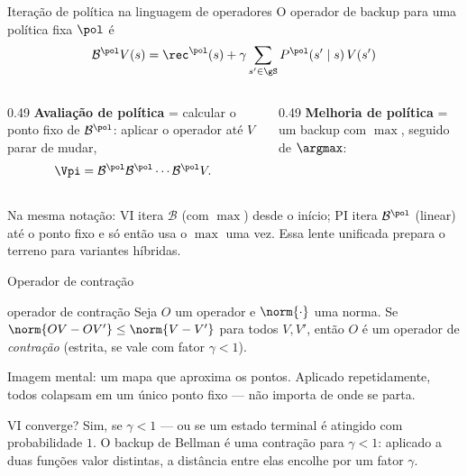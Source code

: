 \documentclass[aspectratio=169, 11pt]{beamer}
\newcommand{\Bop}{\mathcal{B}}                 %
\newcommand{\Bpol}{\mathcal{B}^{\pol}}         %
\begin{document}
\begin{frame}{Iteração de política na linguagem de operadores}
  O operador de backup \alert{para uma política fixa} $\pol$ é
  \[
    \Bpol V(s) = \rec^{\pol}(s) + \gamma \sum_{s' \in \gS} P^{\pol}(s' \mid s)\, V(s')
  \]
  \begin{columns}[T]
    \begin{column}{0.49\textwidth}
      \textbf{Avaliação de política} = calcular o \alert{ponto fixo} de $\Bpol$:
      aplicar o operador até $V$ parar de mudar,
      \[
        \Vpi = \Bpol \Bpol \cdots \Bpol V.
      \]
    \end{column}
    \begin{column}{0.49\textwidth}
      \textbf{Melhoria de política} = um backup com $\max$, seguido de $\argmax$:
      \vspace{-0.3em}
      \begin{center}
      \end{center}
    \end{column}
  \end{columns}
  \vspace{0.4em}
  \begin{ideiabox}
    Na mesma notação: VI itera $\Bop$ (com $\max$) desde o início; PI itera $\Bpol$
    (linear) até o ponto fixo e só então usa o $\max$ uma vez. Essa lente unificada
    prepara o terreno para variantes híbridas.
  \end{ideiabox}
\end{frame}

\begin{frame}{Operador de contração}
  \begin{defbox}[fontupper=\small]{operador de contração}
    Seja $O$ um operador e $\norm{\cdot}$ uma norma. Se
    $\norm{OV - OV'} \le \norm{V - V'}$ para todos $V, V'$, então $O$ é um operador de
    \emph{contração} (estrita, se vale com fator $\gamma<1$).
  \end{defbox}
  \begin{ideiabox}
    Imagem mental: um mapa que \alert{aproxima os pontos}. Aplicado repetidamente,
    todos colapsam em um único ponto fixo --- não importa de onde se parta.
  \end{ideiabox}
  \begin{teobox}{VI converge?}
    Sim, se $\gamma < 1$ --- ou se um estado terminal é atingido com probabilidade $1$.
    O backup de Bellman é uma contração para $\gamma<1$: aplicado a duas funções valor
    distintas, a distância entre elas \alert{encolhe} por um fator $\gamma$.
  \end{teobox}
\end{frame}
\end{document}
